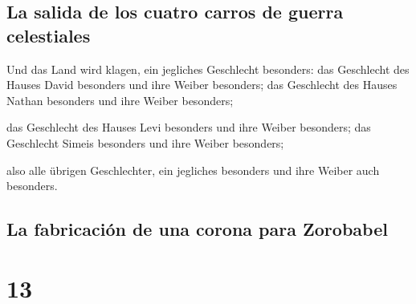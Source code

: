 \hypertarget{la-salida-de-los-cuatro-carros-de-guerra-celestiales}{%
\subsection{La salida de los cuatro carros de guerra
celestiales}\label{la-salida-de-los-cuatro-carros-de-guerra-celestiales}}

 Und das Land wird klagen, ein jegliches Geschlecht
besonders: das Geschlecht des Hauses David besonders und ihre Weiber
besonders; das Geschlecht des Hauses Nathan besonders und ihre Weiber
besonders;

 das Geschlecht des Hauses Levi besonders und ihre Weiber
besonders; das Geschlecht Simeis besonders und ihre Weiber besonders;

 also alle übrigen Geschlechter, ein jegliches besonders
und ihre Weiber auch besonders.

\hypertarget{la-fabricaciuxf3n-de-una-corona-para-zorobabel}{%
\subsection{La fabricación de una corona para
Zorobabel}\label{la-fabricaciuxf3n-de-una-corona-para-zorobabel}}

\hypertarget{section-12}{%
\section{13}\label{section-12}}

